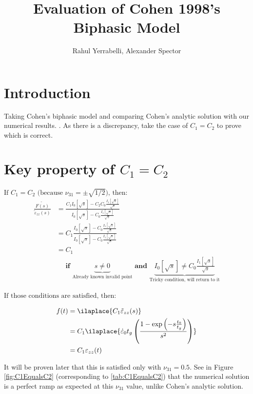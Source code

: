 \documentclass{article}
\title{Evaluation of Cohen 1998's Biphasic Model}
\author{Rahul Yerrabelli, Alexander Spector}
\begin{document}
\maketitle

\section{Introduction}
Taking Cohen's biphasic model and comparing Cohen's analytic solution with our numerical results. \cite{cohen1998}. As there is a discrepancy, take the case of $C_1=C_2$ to prove which is correct.

\section{Key property of $C_1=C_2$}

$\text{If $C_1=C_2$ (because $\nu_{31}=\pm\sqrt{1/2}$), then:}$
\begin{align}
\frac{\widetilde{F(s)}}{\tilde{\varepsilon}_{zz}(s)}
&=\frac{C_{1} I_{0}\left[\sqrt{s}\right]-C_{2} C_{0} \frac{I_{1}\left[\sqrt{s}\right]}{\sqrt{s}}}{I_{0}\left[\sqrt{s}\right]-C_{0} \frac{I_{1}\left[\sqrt{s}\right]}{\sqrt{s}}}  \\
&= C_{1} \frac{I_{0}\left[\sqrt{s}\right]-C_{0} \frac{I_{1}\left[\sqrt{s}\right]}{\sqrt{s}}}{I_{0}\left[\sqrt{s}\right]-C_{0} \frac{I_{1}\left[\sqrt{s}\right]}{\sqrt{s}}}  \\
&= C_1 \\
&\quad \textbf{ if } \underbrace{s\neq0}_{\text{Already known } \text{invalid point}} \textbf{ and }
\underbrace{I_{0}\left[\sqrt{s}\right] \neq C_{0} \frac{I_{1}\left[\sqrt{s}\right]}{\sqrt{s}}}_{\text{Tricky condition, } \text{will return to it}}
\end{align}

$\text{If those conditions are satisfied, then:}$

\begin{align}
f(t) &= \ilaplace{C_1 \tilde{\varepsilon}_{zz}(s)} \\
&= C_1 \ilaplace{\dot{\varepsilon}_{0} t_{g} \left( \frac{1-\exp \left(-s \frac{t_{0}}{t_{g}}\right)}{s^{2}} \right)} \\
&= C_1 \varepsilon_{zz}(t)
\end{align}

It will be proven later that this is satisfied only with $\nu_{31}=0.5$. See in Figure \ref{fig:C1EqualsC2} (corresponding to \ref{tab:C1EqualsC2}) that the numerical solution is a perfect ramp as expected at this $\nu_{31}$ value, unlike Cohen's analytic solution.
\end{document}
